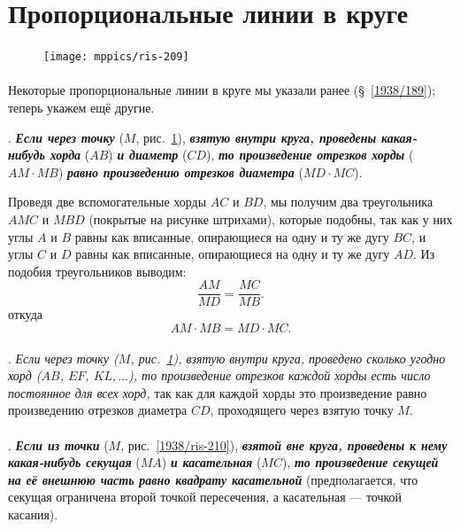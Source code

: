\documentclass[oneside]{book}
\begin{document}

\pagebreak%

\section{Пропорциональные линии в круге}

\begin{figure}
\vskip-5mm
\centering
\texttt{[image: mppics/ris-209]}
\caption{}\label{1938/ris-209}
\end{figure}

\paragraph{}\label{1938/199}
Некоторые пропорциональные линии в круге мы указали ранее (§~\ref{1938/189});
теперь укажем ещё другие.

\mbox{.}
\textbf{\emph{Если через точку}} ($M$, рис.~\ref{1938/ris-209}), \textbf{\emph{взятую внутри круга, проведены какая-нибудь хорда}} ($AB$) \textbf{\emph{и диаметр}} ($CD$), \textbf{\emph{то произведение отрезков хорды}} ($AM\cdot  MB$) \textbf{\emph{равно произведению отрезков диаметра}} ($MD\cdot  MC$).

Проведя две вспомогательные хорды $AC$ и $BD$, мы получим два треугольника $AMC$ и $MBD$ (покрытые на рисунке штрихами), которые подобны, так как у них углы $A$ и $B$ равны как вписанные, опирающиеся на одну и ту же дугу $BC$, и углы $C$ и $D$ равны как вписанные, опирающиеся на одну и ту же дугу $AD$.
Из подобия треугольников выводим:
\[\frac{AM}{MD}=\frac{MC}{MB}.\]
откуда
\[AM\cdot  MB=MD\cdot  MC.\]

\paragraph{}\label{1938/200}
.
\emph{Если через точку \emph{($M$, рис.~\ref{1938/ris-209}),} взятую внутри круга, проведено сколько угодно хорд ($AB$, $EF$, $KL,\dots$), то произведение отрезков каждой хорды есть число постоянное для всех хорд,} так как для каждой хорды это произведение равно произведению отрезков диаметра $CD$, проходящего через взятую точку $M$.

\paragraph{}\label{1938/201}
.
\textbf{\emph{Если из точки}} ($M$, рис.~\ref{1938/ris-210}), \textbf{\emph{взятой вне круга, проведены к нему какая-нибудь секущая}} ($MA$) \textbf{\emph{и касательная}} ($MC$), \textbf{\emph{то произведение секущей на её внешнюю часть равно квадрату касательной}} (предполагается, что секущая ограничена второй точкой пересечения, а касательная — точкой касания).
\end{document}
